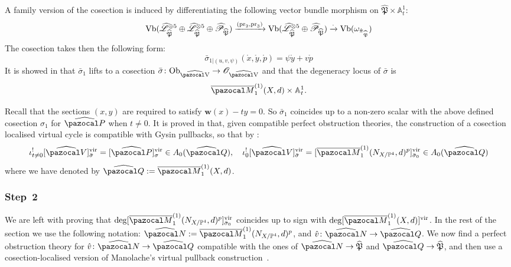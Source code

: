 \documentclass[11pt]{amsart}
\newcommand{\Mone}[3]{\overline{\pazocal M}^{(1)}_{#1}(#2,#3)}
\newcommand{\PP}{\mathbb P}
\newcommand{\OO}{\mathcal O}
\renewcommand{\to}{\rightarrow}
\newcommand{\pr}{\rm{pr}}
\newcommand{\Aaff}{\mathbb A}
\newcommand{\hL}{\widehat{\mathcal L}}
\newcommand{\hP}{\widehat{\mathfrak P}}
\newcommand{\w}{\mathbf{w}}
\theoremstyle{plain}
\theoremstyle{definition}
\begin{document}
 A family version of the cosection is induced by differentiating the following vector bundle morphism on $\hP\times\Aaff^1_t$:
\[
 \rm{Vb}(\hL_{\hP}^{\oplus 5}\oplus\hL_{\hP}^{\otimes 5}\oplus\widehat{\mathcal P}_{\hP})\xrightarrow{(\pr_2,\pr_3)}\rm{Vb}(\hL_{\hP}^{\otimes 5}\oplus\widehat{\mathcal P}_{\hP})\xrightarrow{\cdot}\rm{Vb}(\omega_{\hat\pi_{\hP}})
\]
The cosection takes then the following form:
\[\bar\sigma_{1|(u,v,\psi)}(\mathring{x},\mathring{y},\mathring{p})=\psi\mathring{y}+v\mathring{p}\]
It is showed in \cite[\S4.7]{CLpfields} that $\bar\sigma_1$ lifts to a cosection $\bar\sigma\colon \rm{Ob}_{\widehat{\pazocal V}}\to \OO_{\widehat{\pazocal V}}$ and that the degeneracy locus of $\bar\sigma$ is 
\[\Mone{1}{X}{d}\times\Aaff^1_t.\]

Recall that the sections $(x,y)$ are required to satisfy $\w(x)-ty=0$. So $\bar\sigma_1$ coincides up to a non-zero scalar with the above defined cosection $\sigma_1$ for $\widehat{\pazocal P}$ when $t\neq 0$. It is proved in \cite[Theorem 5.2]{KLcosection} that, given compatible perfect obstruction theories, the construction of a cosection localised virtual cycle is compatible with Gysin pullbacks, so that by \cite[Proposition 4.9]{CLpfields}:
\[
 \iota_{t\neq0}^![\widehat{\pazocal V}]^{\rm{vir}}_{\rm{\bar\sigma}}=[\widehat{\pazocal P}]^{\rm{vir}}_{\rm{\sigma}}\in A_0(\widehat{\pazocal Q}),\quad \iota_{0}^![\widehat{\pazocal V}]^{\rm{vir}}_{\rm{\bar\sigma}}=[\Mone{1}{N_{X/\PP^4}}{d}^p]^{\rm{vir}}_{\rm{\bar\sigma_0}}\in A_0(\widehat{\pazocal Q})
\]
where we have denoted by $\widehat{\pazocal Q}:=\Mone{1}{X}{d}$.
\subsubsection*{Step~2}
We are left with proving that $\deg[\Mone{1}{N_{X/\PP^4}}{d}^p]^{\rm{vir}}_{\rm{\bar\sigma_0}}$ coincides up to sign with $\deg[\Mone{1}{X}{d}]^{\rm{vir}}$.
In the rest of the section we use the following notation: $\widehat{\pazocal N}:=\Mone{1}{N_{X/\PP^4}}{d}^p$, and $\hat v\colon\widehat{\pazocal N}\to\widehat{\pazocal Q}$. 
We now find a perfect obstruction theory for $\hat v\colon\widehat{\pazocal N}\to\widehat{\pazocal Q}$ compatible with the ones of $\widehat{\pazocal N}\to\hP$ and $\widehat{\pazocal Q}\to\hP$, and then use a cosection-localised version of Manolache's virtual pullback construction~\cite{Manolache-pullback}.
\end{document}

